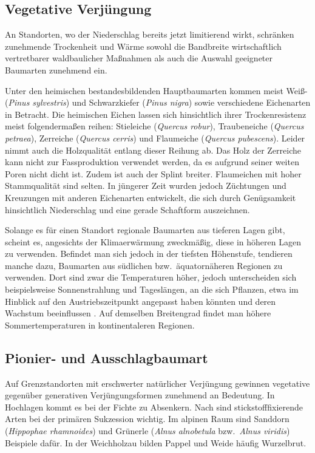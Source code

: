 \documentclass[twocolumn]{scrartcl}
\begin{document}
\subsection{Vegetative Verjüngung}

An Standorten, wo der Niederschlag bereits jetzt limitierend wirkt,
schränken zunehmende Trockenheit und Wärme sowohl die Bandbreite
wirtschaftlich vertretbarer waldbaulicher Maßnahmen als auch die
Auswahl geeigneter Baumarten zunehmend ein.

Unter den heimischen bestandesbildenden Hauptbaumarten kommen meist
Weiß- (\emph{Pinus sylvestris}) und Schwarzkiefer (\emph{Pinus nigra})
sowie verschiedene Eichenarten in Betracht. Die heimischen Eichen
lassen sich hinsichtlich ihrer Trockenresistenz meist folgendermaßen
reihen: Stieleiche (\emph{Quercus robur}), Traubeneiche (\emph{Quercus
petraea}), Zerreiche (\emph{Quercus cerris}) und Flaumeiche
(\emph{Quercus pubescens}). Leider nimmt auch die Holzqualität entlang
dieser Reihung ab. Das Holz der Zerreiche kann nicht zur
Fassproduktion verwendet werden, da es aufgrund seiner weiten Poren
nicht dicht ist. Zudem ist auch der Splint breiter. Flaumeichen mit
hoher Stammqualität sind selten. In jüngerer Zeit wurden jedoch
Züchtungen und Kreuzungen mit anderen Eichenarten entwickelt, die sich
durch Genügsamkeit hinsichtlich Niederschlag und eine gerade
Schaftform auszeichnen.

Solange es für einen Standort regionale Baumarten aus tieferen Lagen
gibt, scheint es, angesichts der Klimaerwärmung zweckmäßig, diese in
höheren Lagen zu verwenden. Befindet man sich jedoch in der tiefsten
Höhenstufe, tendieren manche dazu, Baumarten aus südlichen
bzw.\ äquatornäheren Regionen zu verwenden. Dort sind zwar die
Temperaturen höher, jedoch unterscheiden sich beispielsweise
Sonnenstrahlung und Tageslängen, an die sich Pflanzen, etwa im
Hinblick auf den Austriebszeitpunkt angepasst haben könnten
\citep{phillips1941tageslaenge} und deren Wachstum beeinflussen
\citep{jester1939zuwachsUndTageslaenge}. Auf demselben Breitengrad
findet man höhere Sommertemperaturen in kontinentaleren Regionen.

\subsection{Pionier- und Ausschlagbaumart}

Auf Grenzstandorten mit erschwerter natürlicher Verjüngung gewinnen
vegetative gegenüber generativen Verjüngungsformen zunehmend an
Bedeutung. In Hochlagen kommt es bei der Fichte zu Absenkern. Nach
\citet{boring1984robinie} sind stickstofffixierende Arten bei der
primären Sukzession wichtig. Im alpinen Raum sind Sanddorn
(\emph{Hippophae rhamnoides}) und Grünerle (\emph{Alnus alnobetula}
bzw.\ \emph{Alnus viridis}) Beispiele dafür. In der Weichholzau bilden
Pappel und Weide häufig Wurzelbrut.
\end{document}
